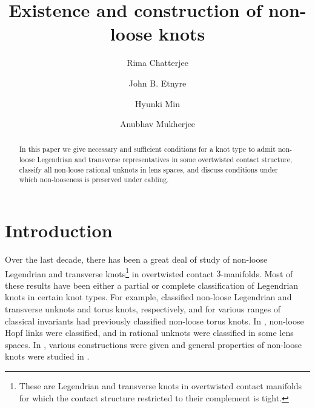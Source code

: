 \documentclass[11pt]{amsart}
\theoremstyle{plain}
\theoremstyle{definition}
\theoremstyle{remark}
\numberwithin{theorem}{section}
\begin{document}
\title{Existence and construction of non-loose knots}

\author{Rima Chatterjee}

\author{John B. Etnyre}

\author{Hyunki Min}

\author{Anubhav Mukherjee}

\address{School of Mathematics \\ Georgia Institute of Technology \\  Atlanta, GA}

\address{Department of Mathematics \\ The University of California, Los Angeles, CA}

\address{Department of Mathematics \\ Princeton University, Princeton, NJ}

\address{Department of Mathematics \\ University of Cologne, Germany}


\begin{abstract}
In this paper we give necessary and sufficient conditions for a knot type to admit non-loose Legendrian and transverse representatives in some overtwisted contact structure, classify all non-loose rational unknots in lens spaces, and discuss conditions under which non-looseness is preserved under cabling. 
\end{abstract}

\maketitle


\section{Introduction}

Over the last decade, there has been a great deal of study of non-loose Legendrian and transverse knots\footnote{These are Legendrian and transverse knots in overtwisted contact manifolds for which the contact structure restricted to their complement is tight.} in overtwisted contact $3$-manifolds. Most of these results have been either a partial or complete classification of Legendrian knots in certain knot types. For example, \cite{EliashbergFraser98, EtnyreMinMukherjee22pre} classified non-loose Legendrian and transverse unknots and torus knots, respectively, and for various ranges of classical invariants \cite{GeigesOnaran20a, Matkovic20Pre} had previously classified non-loose torus knots. In \cite{GeigesOnaran20b}, non-loose Hopf links were classified, and in \cite{GeigesOnaran15} rational unknots were classified in some lens spaces. In \cite{Ghiggini06b, Ghiggini06, LiscaOzsvathStipsiczSzab09}, various constructions were given and general properties of non-loose knots were studied in \cite{Etnyre13}.
\end{document}
